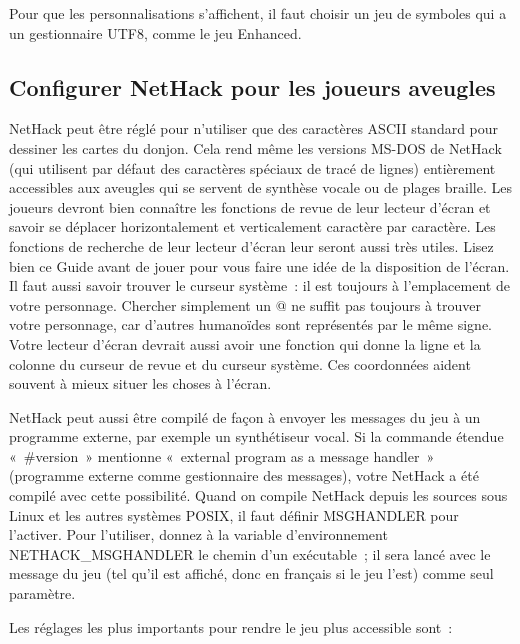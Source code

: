 \documentclass[titlepage]{article}
\begin{document}
Pour que les personnalisations s'affichent, il faut choisir un jeu de
symboles qui a un gestionnaire UTF8, comme le jeu Enhanced.

\subsection{Configurer NetHack pour les joueurs aveugles}



NetHack peut être réglé pour n'utiliser que des caractères ASCII standard
pour dessiner les cartes du donjon.
Cela rend même les versions MS-DOS de NetHack (qui utilisent par défaut
des caractères spéciaux de tracé de lignes) entièrement accessibles aux
aveugles qui se servent de synthèse vocale ou de plages braille.
Les joueurs devront bien connaître les fonctions de revue de leur lecteur
d'écran et savoir se déplacer horizontalement et verticalement caractère
par caractère.
Les fonctions de recherche de leur lecteur d'écran leur seront aussi très
utiles.
Lisez bien ce Guide avant de jouer pour vous faire une idée de la
disposition de l'écran.
Il faut aussi savoir trouver le curseur système~: il est toujours à
l'emplacement de votre personnage.
Chercher simplement un @ ne suffit pas toujours à trouver votre
personnage, car d'autres humanoïdes sont représentés par le même signe.
Votre lecteur d'écran devrait aussi avoir une fonction qui donne la ligne
et la colonne du curseur de revue et du curseur système.
Ces coordonnées aident souvent à mieux situer les choses à l'écran.


NetHack peut aussi être compilé de façon à envoyer les messages du jeu à un
programme externe, par exemple un synthétiseur vocal.
Si la commande étendue «~\#version~» mentionne «~external
program as a message handler~» (programme externe comme gestionnaire
des messages), votre NetHack a été compilé avec cette possibilité.
Quand on compile NetHack depuis les sources sous Linux et les autres
systèmes POSIX, il faut définir MSGHANDLER pour l'activer.
Pour l'utiliser, donnez à la variable d'environnement NETHACK\_MSGHANDLER le
chemin d'un exécutable~; il sera lancé avec le message du jeu (tel qu'il
est affiché, donc en français si le jeu l'est) comme seul paramètre.


Les réglages les plus importants pour rendre le jeu plus accessible sont~:
\end{document}
